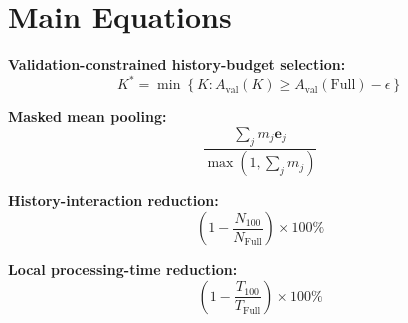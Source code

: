 \documentclass[11pt,a4paper]{article}
\begin{document}
\section{Main Equations}
\noindent\textbf{Validation-constrained history-budget selection:}
\begin{equation}
K^* = \min \left\{ K : A_{\mathrm{val}}(K) \geq A_{\mathrm{val}}(\mathrm{Full}) - \epsilon \right\}
\end{equation}

\noindent\textbf{Masked mean pooling:}
\begin{equation}
\frac{\sum_j m_j \mathbf{e}_j}{\max(1, \sum_j m_j)}
\end{equation}

\noindent\textbf{History-interaction reduction:}
\begin{equation}
\left(1 - \frac{N_{100}}{N_{\mathrm{Full}}}\right) \times 100\%
\end{equation}

\noindent\textbf{Local processing-time reduction:}
\begin{equation}
\left(1 - \frac{T_{100}}{T_{\mathrm{Full}}}\right) \times 100\%
\end{equation}
\end{document}
